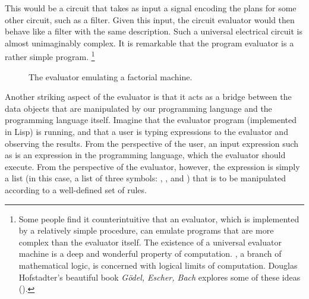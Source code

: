 This would be a circuit that takes as input a signal encoding the plans for some other circuit, such as a filter.
Given this input, the circuit evaluator would then behave like a filter with the same description.
Such a universal electrical circuit is almost unimaginably complex.
It is remarkable that the program evaluator is a rather simple program.%
\footnote{
	Some people find it counterintuitive that an evaluator, which is implemented by a relatively simple procedure, can emulate programs that are more complex than the evaluator itself.
	The existence of a universal evaluator machine is a deep and wonderful property of computation.
	, a branch of mathematical logic, is concerned with logical limits of computation.
	Douglas Hofstadter’s beautiful book \textit{Gödel, Escher, Bach} explores some of these ideas ().
}

\begin{figure}[tb]
	\centering
	
	\caption{
		The evaluator emulating a factorial machine.
	}
	\label{Figure 4.3}
\end{figure}

Another striking aspect of the evaluator is that it acts as a bridge between the data objects that are manipulated by our programming language and the programming language itself.
Imagine that the evaluator program (implemented in Lisp) is running, and that a user is typing expressions to the evaluator and observing the results.
From the perspective of the user, an input expression such as  is an expression in the programming language, which the evaluator should execute.
From the perspective of the evaluator, however, the expression is simply a list (in this case, a list of three symbols:
\code{*}, , and ) that is to be manipulated according to a well-defined set of rules.

